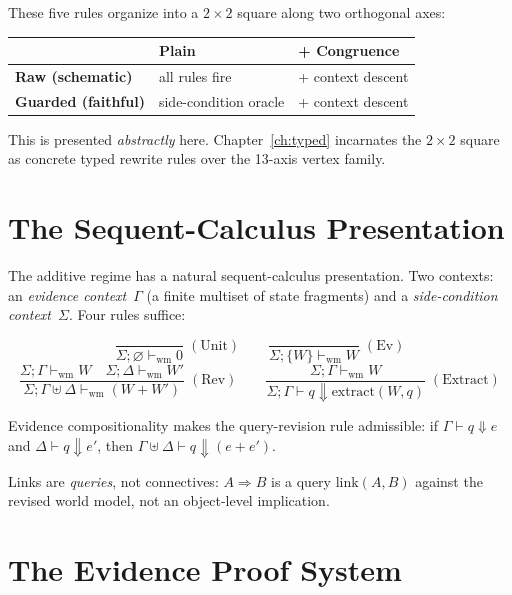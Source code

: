 \documentclass[11pt,openany]{report}
\begin{document}
\noindent
These five rules organize into a $2 \times 2$ square along two
orthogonal axes:

\begin{center}
\begin{tabular}{lll}
\toprule
& \textbf{Plain} & \textbf{+ Congruence} \\
\midrule
\textbf{Raw (schematic)} & all rules fire & + context descent \\
\textbf{Guarded (faithful)} & side-condition oracle & + context descent \\
\bottomrule
\end{tabular}
\end{center}

\noindent
This is presented \emph{abstractly} here.
Chapter~\ref{ch:typed} incarnates the $2 \times 2$ square as
concrete typed rewrite rules over the 13-axis vertex family.


\section{The Sequent-Calculus Presentation}
\label{sec:sequent-calculus}

The additive regime has a natural sequent-calculus presentation.
Two contexts: an \emph{evidence context}~$\Gamma$ (a finite multiset
of state fragments) and a \emph{side-condition context}~$\Sigma$.
Four rules suffice:

\[
\frac{}{\Sigma; \varnothing \vdash_{\mathrm{wm}} 0} \;(\text{Unit})
\qquad
\frac{}{\Sigma; \{W\} \vdash_{\mathrm{wm}} W} \;(\text{Ev})
\]
\[
\frac{\Sigma; \Gamma \vdash_{\mathrm{wm}} W \quad
      \Sigma; \Delta \vdash_{\mathrm{wm}} W'}
     {\Sigma; \Gamma \uplus \Delta \vdash_{\mathrm{wm}} (W + W')}
\;(\text{Rev})
\qquad
\frac{\Sigma; \Gamma \vdash_{\mathrm{wm}} W}
     {\Sigma; \Gamma \vdash q \Downarrow \mathrm{extract}(W, q)}
\;(\text{Extract})
\]

\noindent
Evidence compositionality makes the query-revision rule admissible:
if $\Gamma \vdash q \Downarrow e$ and $\Delta \vdash q \Downarrow e'$,
then $\Gamma \uplus \Delta \vdash q \Downarrow (e + e')$.

Links are \emph{queries}, not connectives: $A \Rightarrow B$ is a
query $\mathrm{link}(A, B)$ against the revised world model, not an
object-level implication.


\section{The Evidence Proof System}
\label{sec:evidence-proof-system}
\end{document}
